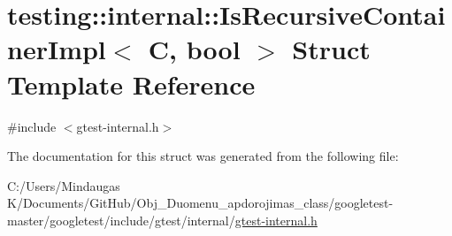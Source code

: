 \hypertarget{structtesting_1_1internal_1_1_is_recursive_container_impl}{}\section{testing\+::internal\+::Is\+Recursive\+Container\+Impl$<$ C, bool $>$ Struct Template Reference}
\label{structtesting_1_1internal_1_1_is_recursive_container_impl}


{\ttfamily \#include $<$gtest-\/internal.\+h$>$}



The documentation for this struct was generated from the following file\+:\begin{DoxyCompactItemize}
\item 
C\+:/\+Users/\+Mindaugas K/\+Documents/\+Git\+Hub/\+Obj\+\_\+\+Duomenu\+\_\+apdorojimas\+\_\+class/googletest-\/master/googletest/include/gtest/internal/\mbox{\hyperlink{googletest-master_2googletest_2include_2gtest_2internal_2gtest-internal_8h}{gtest-\/internal.\+h}}\end{DoxyCompactItemize}
